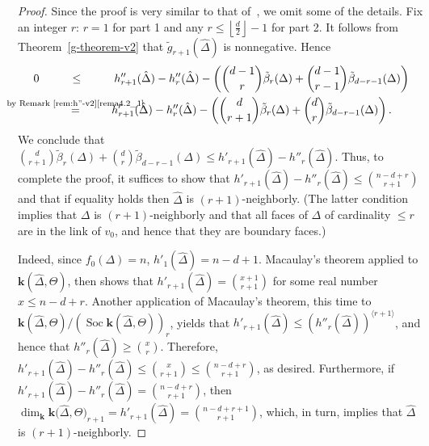 \documentclass[ALCO,ThmDefs,Unicode,epreuves]{cedram}
\DeclareMathOperator{\Soc}{Soc}
\newcommand{\complet}[1]{\hat{#1}}
\newcommand{\field}{\mathbf{k}}
\newcommand{\halffloor}{\left\lfloor \frac{d}{2}\right\rfloor}
\begin{document}
\begin{proof} Since the proof is very similar to that of~\cite[Theorem~4.3]{Novik-Swartz-09:DS}, we omit some of the details. Fix an integer $r$: $r=1$ for part 1 and any $r\leq\halffloor-1$ for part 2. It follows from Theorem~\ref{g-theorem-v2} that $\tilde{g}_{r+1}(\complet{\Delta})$ is nonnegative. Hence
\begin{align*}
0 &\ \ \ \ \ \ \ \ \leq \ \ \ \ \ \ \ \ 
h''_{r+1}(\complet{\Delta})-h''_{r}(\complet{\Delta})-\left(\binom{d-1}{r}\tilde{\beta}_{r}(\Delta)+\binom{d-1}{r-1}\tilde{\beta}_{d-r-1}(\Delta)\right)\\
&%
\ \ \ \ \ \ \ \ \mathop{=}^{\hbox to 0pt{\hss\scriptsize by Remark~\ref{rem:h''-v2}\eqref{rema4.2_1}\hss}}\ \ \ \ \ \ \ \ 
h'_{r+1}(\complet{\Delta})-h''_{r}(\complet{\Delta})-\left(\binom{d}{r+1}\tilde{\beta}_{r}(\Delta)+\binom{d}{r}\tilde{\beta}_{d-r-1}(\Delta)\right).
\end{align*}
We conclude that $\binom{d}{r+1}\tilde{\beta}_{r}(\Delta)+\binom{d}{r}\tilde{\beta}_{d-r-1}(\Delta) \leq h'_{r+1}(\complet{\Delta})-h''_{r}(\complet{\Delta})$. Thus, to complete the proof, it suffices to show that $h'_{r+1}(\complet{\Delta})-h''_{r}(\complet{\Delta}) \leq \binom{n-d+r}{r+1}$ and that if equality holds then $\complet{\Delta}$ is $(r+1)$-neighborly. (The latter condition implies that $\Delta$ is $(r+1)$-neighborly and that all faces of $\Delta$ of cardinality $\leq r$ are in the link of $v_0$, and hence that they are boundary faces.)

Indeed, since $f_0(\Delta)=n$, $h'_1(\complet{\Delta})=n-d+1$. Macaulay's theorem applied to $\field(\complet{\Delta},\Theta)$, then shows that $h'_{r+1}(\complet{\Delta})=\binom{x+1}{r+1}$ for some real number $x \leq n-d+r$. 
Another application of Macaulay's theorem, this time to $\field(\complet{\Delta},\Theta)/(\Soc \field(\complet{\Delta},\Theta))_r$, yields that $h'_{r+1}(\complet{\Delta})\leq (h''_r(\complet{\Delta}))^{\langle r+1 \rangle}$, and hence that $h''_r(\complet{\Delta})\geq\binom{x}{r}$. Therefore, $h'_{r+1}(\complet{\Delta})-h''_{r}(\complet{\Delta}) \leq \binom{x}{r+1} \leq \binom{n-d+r}{r+1}$, as desired. Furthermore, if $h'_{r+1}(\complet{\Delta})-h''_{r}(\complet{\Delta}) = \binom{n-d+r}{r+1}$, then $\dim_\field \field\big(\complet{\Delta},\Theta\big)_{r+1}=h'_{r+1}(\complet{\Delta})=\binom{n-d+r+1}{r+1}$, which, in turn, implies that $\complet{\Delta}$ is $(r+1)$-neighborly.
\end{proof}
\end{document}
